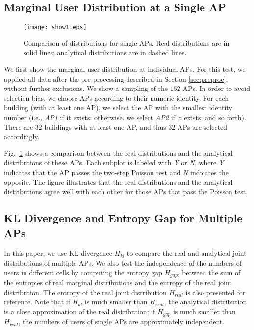 \subsection{Marginal User Distribution at a Single AP}

\begin{figure}[t]
\centering  \vspace*{0pt}
\texttt{[image: show1.eps]}
\caption{Comparison of distributions for single APs. Real distributions  are in solid lines; analytical distributions are in dashed lines.}
\label{SD1}
\end{figure}



We first show the marginal user distribution at individual APs.   For this test, we applied all data after the pre-processing described in Section \ref{sec:preproc}, without further exclusions.
We show a sampling of the $152$ APs. In order to avoid selection bias, we choose APs according to their numeric identity. For each building (with at least one AP), we select the AP with the smallest identity number (i.e., \emph{AP1} if it exists; otherwise, we select \emph{AP2} if it exists; and so forth). There are $32$ buildings with at least one AP, and thus $32$ APs are selected accordingly.

Fig.~\ref{SD1} shows a comparison between the real distributions and the analytical distributions of these APs.  Each subplot is labeled with \emph{Y} or \emph{N}, where \emph{Y} indicates that the AP passes the two-step Poisson test and \emph{N} indicates the opposite.
The figure illustrates that the real distributions and the analytical distributions agree well with each other for those APs that pass the Poisson test.




\subsection{KL Divergence and Entropy Gap for Multiple APs}


 In this paper,   we use KL  divergence $H_{kl}$ to compare the real and analytical joint distributions of multiple APs.
We also test the independence of the numbers of users in different cells by computing
the entropy gap $H_{gap}$, between  the sum of the entropies of real marginal distributions and the entropy of the real joint distribution. The entropy of the real joint distribution $H_{real}$ is also presented for reference. {Note that if $H_{kl}$ is much smaller than $H_{real}$, the analytical distribution  is a close approximation of the real distribution; if $H_{gap}$ is much smaller than $H_{real}$, the numbers of users of single APs are approximately independent.}


